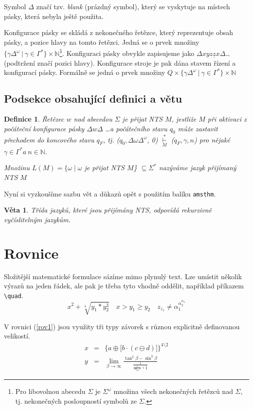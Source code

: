 \documentclass[twocolumn, 11pt, a4paper]{article}
\newtheorem{definition}{Definice}
\newtheorem{veta}{Věta}
\begin{document}
\begin{twocolumn}
Symbol $\Delta$ značí tzv. \emph{blank} (prázdný symbol), který se vyskytuje na místech pásky, která nebyla ještě použita.

Konfigurace pásky se skládá z nekonečného řetězce, který reprezentuje obsah pásky, a pozice hlavy na tomto řetězci. Jedná se o prvek množiny $\{\gamma{\Delta^\omega} \:|\: \gamma \in \Gamma^* \} \times \mathbb{N}$\footnote{Pro libovolnou abecedu $\Sigma$ je $\Sigma^\omega$ množina všech nekonečných řetězců nad $\Sigma$, tj. nekonečných posloupností symbolů ze $\Sigma$.}.
Konfiguraci pásky obvykle zapisujeme jako $\Delta xyz\underline{z}x\Delta$\dots\\(podtržení značí pozici hlavy).
Konfigurace stroje je pak dána stavem řízení a konfigurací pásky. Formálně se jedná o prvek množiny $Q \times \{\gamma{\Delta^\omega} \:|\: \gamma \in \Gamma^* \} \times \mathbb{N}$
\subsection{Podsekce obsahující definici a větu}
\begin{definition}
\label{def2}
\textup{Řetězec $w$ nad abecedou $\Sigma$ je přijat NTS $M$}, jestliže $M$ při aktivaci z počáteční konfigurace pásky \underline{$\Delta$}$w\Delta$ \ldots a počátečního stavu $q_0$ může zastavit přechodem do koncového stavu $q_F$, tj. ($q_0, \Delta\omega\Delta^\omega$, 0) \;$\overset{*}{\underset{M}{\vdash}}$ \;($q_F, \gamma, n$) pro nějaké $\gamma \in \Gamma^* a\: n \in \mathbb{N}$.

Množinu $L(M) = \{ \omega\; |\; \omega$ je přijat NTS $M$\} $\subseteq \Sigma^*$ nazýváme \textup{jazyk přijímaný NTS} $M$
\end{definition}
Nyní si vyzkoušíme sazbu vět a důkazů opět s použitím balíku \verb-amsthm-.
\begin{veta}
Třída jazyků, které jsou přijímány NTS, odpovídá \textup{rekurzivně vyčíslitelným jazykům}.\end{veta}

\section{Rovnice}
Složitější matematické formulace sázíme mimo plynulý text. Lze umístit několik výrazů na jeden řádek, ale pak je třeba tyto vhodně oddělit, například příkazem \verb-\quad-.
$$x^2 + \sqrt[4]{y_1 * y_2^3} \quad x > y_1 \geq y_2 \quad z_{z_z} \ne \alpha_1^{\alpha_2^{\alpha_3}}$$


V rovnici (\ref{rov1}) jsou využity tři typy závorek s různou explicitně definovanou velikostí.
\begin{eqnarray}
    x & = & \bigg\{a \oplus \Big[b \cdot (c \ominus d)\Big] \bigg\}^{4\setminus 2}
    \label{rov1}\\
    y & = & \lim\limits_{\beta\rightarrow\infty} \frac{\tan^2\beta - \sin^3\beta}{\frac{1}{\frac{1}{log_{42} \,x} + \frac{1}{2}} }
    \label{rov2}
\end{eqnarray}


\end{twocolumn}
\end{document}
